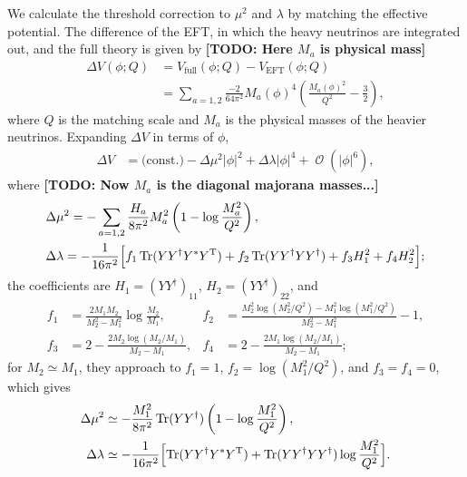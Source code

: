 \documentclass[english,11pt,a4paper]{article}
\numberwithin{equation}{section}  %
\newcommand\w[1]{_{\mathrm{#1}}}
\DeclareMathOperator{\Order}{\mathcal{O}}
\DeclareMathOperator{\Tr}{\mathrm{Tr}}
\newcommand{\TODO}[1]{{\textbf{\small \color{red} [TODO: #1]}}}
\newcommand{\trans}{^{\mathrm T}}
\begin{document}
We calculate the threshold correction to $\mu^2$ and $\lambda$ by matching the effective potential.
The difference of the EFT, in which the heavy neutrinos are integrated out, and the full theory is given by
\TODO{Here $M_a$ is physical mass}
\begin{align}
 \Delta V(\phi;Q)
&= V\w{full}(\phi;Q) - V\w{EFT}(\phi;Q)\\
&= \sum_{a=1,2}\frac{-2}{64\pi^2}M_a(\phi)^4\left(\frac{M_a(\phi)^2}{Q^2}-\frac32\right),
\end{align}
where $Q$ is the matching scale and $M_a$ is the physical masses of the heavier neutrinos.
Expanding $\Delta V$ in terms of $\phi$,
\begin{align}
 \Delta V
&= \text{(const.)} - \Delta \mu^2 |\phi|^2 + \Delta \lambda |\phi|^4 + \Order\left(|\phi|^6\right),
\end{align}
where
\TODO{Now $M_a$ is the diagonal majorana masses...}
\begin{align}
 &\Delta\mu^2= -\sum_{a=1,2}\frac{H_a}{8\pi^2}M_a^2\left(1-\log\frac{M_a^2}{Q^2}\right),
\\
 &\Delta\lambda
=
-\frac{1}{16\pi^2}
\Bigl[f_1 \Tr(Y Y^\dagger Y^*Y\trans)
+f_2\Tr(YY^\dagger YY^\dagger)
+f_3H_1^2+f_4H_2^2
\Bigr];
\end{align}
the coefficients are $H_1 = (YY^\dagger)_{11}$, $H_2 = (YY^\dagger)_{22}$, and
\begin{align*}
 f_1&=\frac{2M_1 M_2}{M_2^2-M_1^2}\log\frac{M_2}{M_1},&
 f_2&=\frac{M_2^2\log(M_2^2/Q^2) - M_1^2\log(M_1^2/Q^2)}{M_2^2 - M_1^2} - 1,\\
 f_3 &= 2-\frac{2M_2\log(M_2/M_1)}{M_2-M_1},&
 f_4 &= 2-\frac{2M_1\log(M_2/M_1)}{M_2-M_1};
\end{align*}
for $M_2\simeq M_1$, they approach to $f_1=1$, $f_2=\log({M_1^2}/{Q^2})$, and $f_3=f_4=0$, which gives
\begin{align}
 \Delta \mu^2
&\simeq -\frac{M_1^2}{8\pi^2}\Tr(YY^\dagger)\left(1-\log\frac{M_1^2}{Q^2}\right),\\
 \Delta \lambda
&\simeq
-\frac{1}{16\pi^2}\Bigl[
 \Tr(Y Y^\dagger Y^*Y\trans) + \Tr(YY^\dagger YY^\dagger)\log\frac{M_1^2}{Q^2}
\Bigr].
\end{align}
\end{document}
